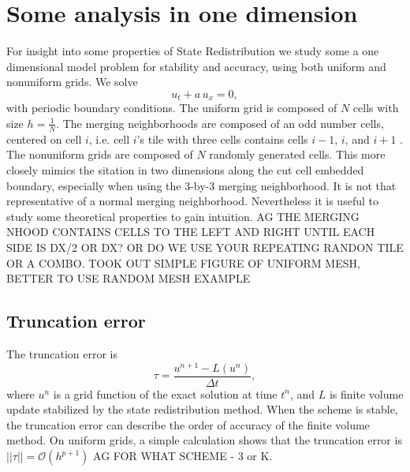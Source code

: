 \section{Some analysis in one dimension}\label{sec:theory}

For insight into some properties of State Redistribution 
we study some a one dimensional model problem for stability and
accuracy, using both uniform and nonuniform grids.
We solve
$$
u_t + a \, u_x = 0,
$$
with periodic boundary conditions.  
The uniform grid is composed of $N$ cells with size $h = \frac{1}{N}$.
The merging neighborhoods are composed of an odd number cells, 
centered on cell $i$, i.e. cell $i$'s tile with three cells  
contains cells $i-1$, $i$, and $i+1$ .
The nonuniform grids are composed of $N$ randomly generated cells.
This more closely mimics the sitation in two dimensions along the cut cell
embedded boundary, especially when using the 3-by-3 merging neighborhood.
It is not that representative of a normal merging neighborhood.
Nevertheless it is useful to study some theoretical properties to gain
intuition.
AG  THE MERGING NHOOD CONTAINS CELLS TO THE LEFT AND RIGHT UNTIL  EACH SIDE IS
DX/2 OR DX?
OR DO WE USE YOUR REPEATING RANDON TILE OR A COMBO.
TOOK OUT SIMPLE FIGURE OF UNIFORM MESH, BETTER TO USE RANDOM MESH EXAMPLE


\subsection{Truncation error}
The truncation error is
$$
\tau = \frac{u^{n+1}- L(u^n)}{\Delta t},
$$
where $u^n$ is a grid function of the exact solution at time $t^n$, 
and $L$ is finite volume update stabilized by the state redistribution method.  
When the scheme is stable, the truncation error can describe the 
order of accuracy of the finite volume method.
On uniform grids, a simple calculation shows that the truncation error 
is $||\tau|| = \mathcal{O}(h^{p+1})$ AG FOR WHAT SCHEME - 3 or K.  

